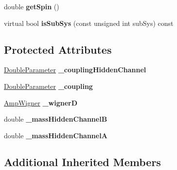 \begin{DoxyCompactItemize}
\item 
\hypertarget{class_amp_flatte_res_af1f4f764b8d9bc3ecf0885d2c0bc8a16}{double {\bfseries get\-Spin} ()}\label{class_amp_flatte_res_af1f4f764b8d9bc3ecf0885d2c0bc8a16}

\item 
\hypertarget{class_amp_flatte_res_a84a21d076a16bd561050636f1a11d2d8}{virtual bool {\bfseries is\-Sub\-Sys} (const unsigned int sub\-Sys) const }\label{class_amp_flatte_res_a84a21d076a16bd561050636f1a11d2d8}

\end{DoxyCompactItemize}
\subsection*{Protected Attributes}
\begin{DoxyCompactItemize}
\item 
\hypertarget{class_amp_flatte_res_a4028cf958cef457c7b286d22b03cab86}{\hyperlink{class_double_parameter}{Double\-Parameter} {\bfseries \-\_\-coupling\-Hidden\-Channel}}\label{class_amp_flatte_res_a4028cf958cef457c7b286d22b03cab86}

\item 
\hypertarget{class_amp_flatte_res_a5675c0fdb0369784d1a3b01f9472f1a0}{\hyperlink{class_double_parameter}{Double\-Parameter} {\bfseries \-\_\-coupling}}\label{class_amp_flatte_res_a5675c0fdb0369784d1a3b01f9472f1a0}

\item 
\hypertarget{class_amp_flatte_res_a8abf0ba653dbc494518ca670450de6b6}{\hyperlink{class_amp_wigner}{Amp\-Wigner} {\bfseries \-\_\-wigner\-D}}\label{class_amp_flatte_res_a8abf0ba653dbc494518ca670450de6b6}

\item 
\hypertarget{class_amp_flatte_res_abc484aa206565bfca140ac1d12d57172}{double {\bfseries \-\_\-mass\-Hidden\-Channel\-B}}\label{class_amp_flatte_res_abc484aa206565bfca140ac1d12d57172}

\item 
\hypertarget{class_amp_flatte_res_a95dcabbe9c00c916427b8d1efc0dadee}{double {\bfseries \-\_\-mass\-Hidden\-Channel\-A}}\label{class_amp_flatte_res_a95dcabbe9c00c916427b8d1efc0dadee}

\end{DoxyCompactItemize}
\subsection*{Additional Inherited Members}


